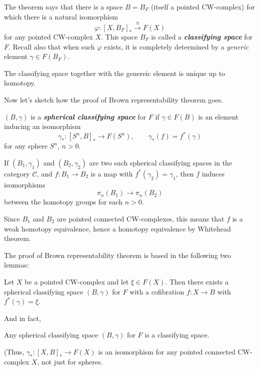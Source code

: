 \begin{remark}
\begin{definition}
\begin{remark}
	The theorem says that there is a space $B=B_{F}$ (itself a pointed CW-complex) for which there is a natural isomorphism
	\[\varphi :[X,B_{F}]_{*}\overset{\cong }{\longrightarrow}F(X)\]
	for any pointed CW-complex $X$. This space $B_{F}$ is called a \textit{\textbf{classifying space}} for $F$. Recall also that when such $\varphi$ exists, it is completely determined by a \textit{generic} element $\gamma\in F(B_{F})$.

	The classifying space together with the genereic element is unique up to homotopy.
\end{remark}

Now let's sketch how the proof of Brown representability theorem goes.

\begin{definition}
	$(B,\gamma)$ is a \textit{\textbf{spherical classifying space}} for $F$ if $\gamma\in F(B)$ is an element inducing an isomorphism
	\[\gamma_{*}:[S^{n},B]_{*}\to F(S^{n}),\qquad \gamma_{*}(f)=f^{*} (\gamma)\]
	for any sphere $S^{n}$, $n>0$.
\end{definition}

\begin{remark}
	If $(B_{1},\gamma_{1})$ and $(B_{2},\gamma_{2})$ are two such spherical classifying spaces in the category $\mathcal{C}$, and $f:B_{1}\to B_{2}$ is a map with $f^{*} (\gamma_{2})=\gamma_{1}$, then $f$ induces isomorphisms
	\[\pi_{n}(B_{1})\to \pi_{n}(B_{2})\]
	between the homotopy groups for each $n>0$.

	Since $B_{1}$ and $B_{2}$ are pointed connected CW-complexes, this means that $f$ is a weak homotopy equivalence, hence a homotopy equivalence by Whitehead theorem.
\end{remark}

The proof of Brown representability theorem is based in the following two lemmas:

\begin{lemma}
	Let $X$ be a pointed CW-complex and let $\xi \in F(X)$. Then there exists a spherical classifying space $(B,\gamma)$ for $F$ with a cofibration  $f:X\to B$ with $f^{*} (\gamma)=\xi$.
\end{lemma}

And in fact,

\begin{lemma}
	Any spherical classifying space $(B,\gamma)$ for $F$ is a classifying space.

	(Thus, $\gamma_{*}:[X,B]_{*}\to F(X)$ is an isomorphism for any pointed connected CW-complex $X$, not just for spheres.
\end{lemma}


\end{definition}
\end{remark}
